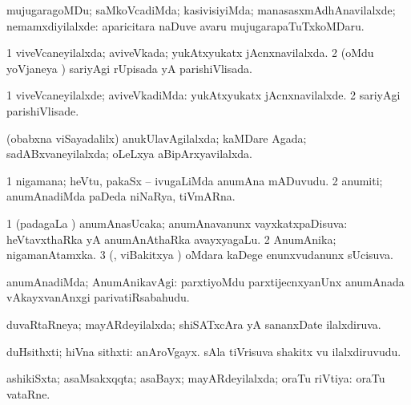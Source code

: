 \noindent
\gl{\nuga}
\bmng
{} 
 mujugaragoMDu; saMkoVcadiMda; kasivisiyiMda; manasasxmAdhAnavilalxde; nemamxdiyilalxde:  aparicitara naDuve avaru mujugarapaTuTxkoMDaru. 
\emng
\eentry

\bentry
{}
\gl{\saMkiSx}
\bmng
{} 
\emng
\eentry

\bentry
{}
\gl{\gu}
\bmng
\bnum
\num{1} viveVcaneyilalxda; aviveVkada; yukAtxyukatx jAcnxnavilalxda. 
\num{2} (oMdu yoVjaneya \vi) sariyAgi rUpisada yA parishiVlisada. 
\enum
\emng
\eentry

\bentry
{}
\gl{\kirxvi}
\bmng
\bnum
\num{1} viveVcaneyilalxde; aviveVkadiMda: yukAtxyukatx jAcnxnavilalxde. 
\num{2} sariyAgi parishiVlisade. 
\enum
\emng
\eentry

\bentry
{}
\gl{\gu}
\bmng
(obabxna viSayadalilx) anukUlavAgilalxda; kaMDare Agada; sadABxvaneyilalxda; oLeLxya aBipArxyavilalxda. 
\emng
\eentry

\bentry
{}
\gl{\nA}
\bmng
\bnum
\num{1} nigamana; heVtu, pakaSx -- ivugaLiMda anumAna mADuvudu. 
\num{2} anumiti; anumAnadiMda paDeda niNaRya, tiVmARna. 
\enum
\emng
\eentry

\bentry
{}
\gl{\gu}
\bmng
\bnum
\num{1} (padagaLa \vi) anumAnasUcaka; anumAnavanunx vayxkatxpaDisuva:  heVtavxthaRka yA anumAnAthaRka avayxyagaLu. 
\num{2} AnumAnika; nigamanAtamxka. 
\num{3} (\vAyx, viBakitxya \vi) oMdara kaDege enunxvudanunx sUcisuva. 
\enum
\emng
\eentry

\bentry
{}
\gl{\kirxvi}
\bmng
anumAnadiMda; AnumAnikavAgi:  parxtiyoMdu parxtijecnxyanUnx anumAnada vAkayxvanAnxgi parivatiRsabahudu. 
\emng
\eentry

\bentry
{}
\gl{\gu}
\bmng
duvaRtaRneya; mayARdeyilalxda; shiSATxcAra yA sananxDate ilalxdiruva. 
\emng
\eentry

\bentry
{}
\gl{\nA}
\bmng
duHsithxti; hiVna sithxti: 
\banum
{} anAroVgayx. 
 sAla tiVrisuva shakitx \mo vu ilalxdiruvudu. 
\eanum
\emng
\eentry

\bentry
{}
\gl{\gu}
\bmng
ashikiSxta; asaMsakxqqta; asaBayx; mayARdeyilalxda; oraTu riVtiya:  oraTu vataRne. 
\emng
\eentry

